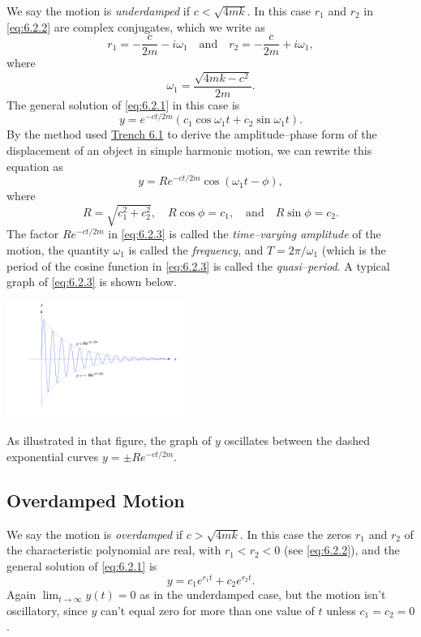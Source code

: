 \documentclass{ximera}
\begin{document}
We say the motion is \textit{underdamped} if $c<\sqrt{4mk}$. In this
case $r_1$ and $r_2$ in \eqref{eq:6.2.2} are complex conjugates, which we
write as
$$
r_1=-\frac{c}{2m}-i\omega_1\quad\mbox{and}\quad
r_2=-\frac{c}{2m}+i\omega_1,
$$
where
$$
\omega_1=\frac{\sqrt{4mk-c^2}}{2m}.
$$
The general solution of  \eqref{eq:6.2.1} in this case is
$$
y=e^{-ct/2m}(c_1\cos\omega_1 t+c_2\sin\omega_1 t).
$$
By the method used \href{https://ximera.osu.edu/ode/main/springProblemsI/springProblemsI}{Trench 6.1}
to derive the
amplitude--phase form of the displacement of an object in simple
harmonic motion, we can rewrite this equation as
\begin{equation}\label{eq:6.2.3}
y=Re^{-ct/2m}\cos(\omega_1 t-\phi),
\end{equation}
 where
$$
R=\sqrt{c_1^2+c_2^2},\quad R\cos\phi=c_1,\quad\mbox{and}\quad R\sin\phi=c_2.
$$
The factor $Re^{-ct/2m}$ in \eqref{eq:6.2.3} is called the \textit{time--varying amplitude} of the motion, the quantity $\omega_1$ is
called the \textit{frequency}, and $T=2\pi/\omega_1$ (which is the
period of the cosine function in \eqref{eq:6.2.3} is called the \textit{quasi--period}. A typical graph of \eqref{eq:6.2.3} is shown below.
 
\begin{image}
  \includegraphics[height=1.5in]{fig060201.jpg}
\end{image}
 
As illustrated in that figure, the graph of $y$
oscillates between the dashed exponential curves $y=\pm Re^{-ct/2m}$.
 
\subsection*{Overdamped Motion}
 
We say the motion is \textit{overdamped} if $c>\sqrt{4mk}$. In this
case the zeros $r_1$ and $r_2$ of the characteristic polynomial are
real, with $r_1<r_2<0$ (see \eqref{eq:6.2.2}), and the general solution of
\eqref{eq:6.2.1} is
$$
y=c_1e^{r_1t}+c_2e^{r_2t}.
$$
Again $\lim_{t\rightarrow\infty}y(t)=0$ as in the
underdamped case, but the motion isn't  oscillatory, since $y$ can't
equal zero for more than one value of $t$ unless $c_1=c_2=0$.
 
\end{document}

